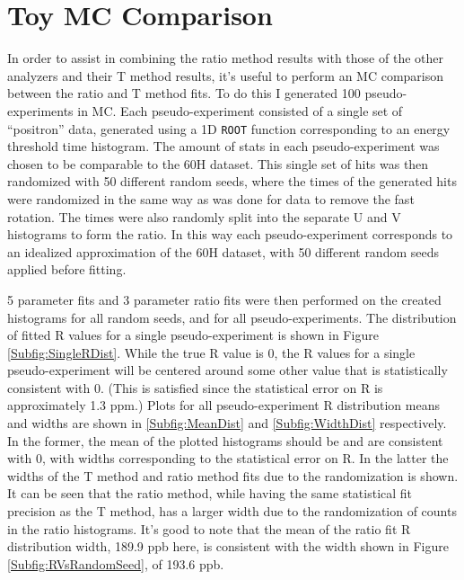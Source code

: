 \clearpage

\section{Toy MC Comparison}


In order to assist in combining the ratio method results with those of the other analyzers and their T method results, it's useful to perform an MC comparison between the ratio and T method fits. To do this I generated 100 pseudo-experiments in MC. Each pseudo-experiment consisted of a single set of ``positron'' data, generated using a 1D \texttt{ROOT} function corresponding to an energy threshold time histogram. The amount of stats in each pseudo-experiment was chosen to be comparable to the 60H dataset. This single set of hits was then randomized with 50 different random seeds, where the times of the generated hits were randomized in the same way as was done for data to remove the fast rotation. The times were also randomly split into the separate U and V histograms to form the ratio. In this way each pseudo-experiment corresponds to an idealized approximation of the 60H dataset, with 50 different random seeds applied before fitting.

5 parameter fits and 3 parameter ratio fits were then performed on the created histograms for all random seeds, and for all pseudo-experiments. The distribution of fitted R values for a single pseudo-experiment is shown in Figure \ref{Subfig:SingleRDist}. While the true R value is 0, the R values for a single pseudo-experiment will be centered around some other value that is statistically consistent with 0. (This is satisfied since the statistical error on R is approximately 1.3 ppm.) Plots for all pseudo-experiment R distribution means and widths are shown in \ref{Subfig:MeanDist} and \ref{Subfig:WidthDist} respectively. In the former, the mean of the plotted histograms should be and are consistent with 0, with widths corresponding to the statistical error on R. In the latter the widths of the T method and ratio method fits due to the randomization is shown. It can be seen that the ratio method, while having the same statistical fit precision as the T method, has a larger width due to the randomization of counts in the ratio histograms. It's good to note that the mean of the ratio fit R distribution width, 189.9 ppb here, is consistent with the width shown in Figure \ref{Subfig:RVsRandomSeed}, of 193.6 ppb.

